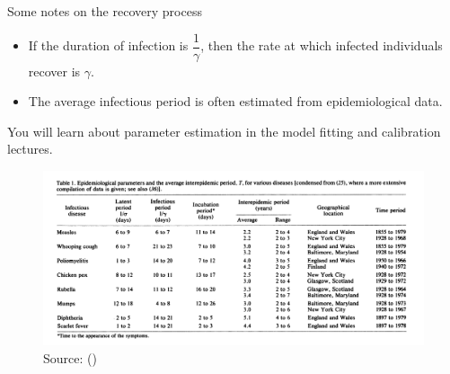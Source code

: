 \documentclass[
  ignorenonframetext,
]{beamer}
\begin{document}
\begin{frame}
\begin{block}{Some notes on the recovery process}
\label{some-notes-on-the-recovery-process}
\begin{itemize}
\item
  If the duration of infection is {\(\dfrac{1}{\gamma}\)}, then the rate
  at which infected individuals recover is {\(\gamma\)}.
\item
  The average infectious period is often {estimated from epidemiological
  data}.
\end{itemize}

\begin{tcolorbox}[enhanced jigsaw, colframe=quarto-callout-note-color-frame, toprule=.15mm, opacitybacktitle=0.6, breakable, colback=white, leftrule=.75mm, left=2mm, opacityback=0, titlerule=0mm, bottomtitle=1mm, toptitle=1mm, title={Note}, bottomrule=.15mm, arc=.35mm, coltitle=black, colbacktitle=quarto-callout-note-color!10!white, rightrule=.15mm]

You will learn about parameter estimation in the model fitting and
calibration lectures.

\end{tcolorbox}
\end{block}
\end{frame}

\begin{frame}
\begin{figure}[H]

{\centering \includegraphics{images/epi_parameters.png}

}

\caption{Source:
()}

\end{figure}%
\end{frame}
\end{document}
